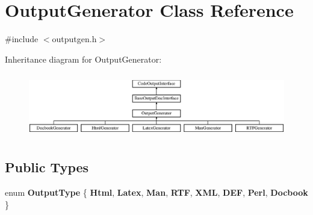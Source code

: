 \hypertarget{class_output_generator}{}\section{Output\+Generator Class Reference}
\label{class_output_generator}


{\ttfamily \#include $<$outputgen.\+h$>$}

Inheritance diagram for Output\+Generator\+:\begin{figure}[H]
\begin{center}
\leavevmode
\includegraphics[height=2.835443cm]{class_output_generator}
\end{center}
\end{figure}
\subsection*{Public Types}
\begin{DoxyCompactItemize}
\item 
\mbox{\label{class_output_generator_ab79b5d3c19d95c8a5929c07f5b2918cf}} 
enum {\bfseries Output\+Type} \{ \newline
{\bfseries Html}, 
{\bfseries Latex}, 
{\bfseries Man}, 
{\bfseries R\+TF}, 
\newline
{\bfseries X\+ML}, 
{\bfseries D\+EF}, 
{\bfseries Perl}, 
{\bfseries Docbook}
 \}
\end{DoxyCompactItemize}
